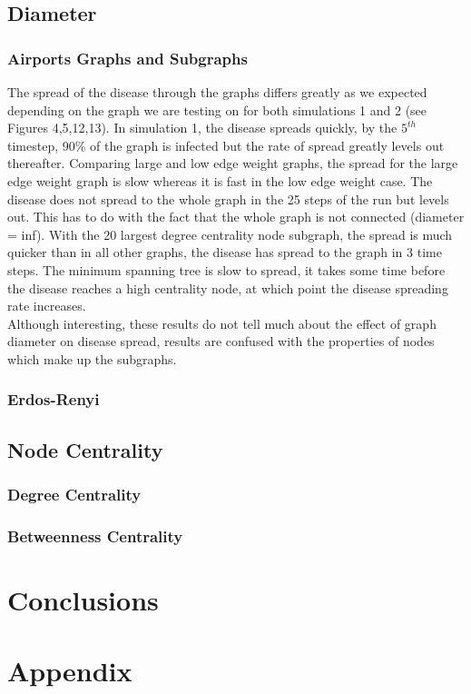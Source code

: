 \documentclass[a4paper,11pt]{article}
\begin{document}
\subsection*{Diameter}
\subsubsection*{Airports Graphs and Subgraphs}
The spread of the disease through the graphs differs greatly as we expected depending on the graph we are testing on for both simulations 1 and 2 (see Figures 4,5,12,13). 
In simulation 1, the disease spreads quickly, by the $5^{th}$ timestep, 90\% of the graph is infected but the rate of spread greatly levels out thereafter. Comparing large and low edge weight graphs, the spread for the large edge weight graph is slow whereas it is fast in the low edge weight case. The disease does not spread to the whole graph in the 25 steps of the run but levels out. This has to do with the fact that the whole graph is not connected (diameter = inf). With the 20 largest degree centrality node subgraph, the spread is much quicker than in all other graphs, the disease has spread to the graph in 3 time steps. The minimum spanning tree is slow to spread, it takes some time before the disease reaches a high centrality node, at which point the disease spreading rate increases.\\
Although interesting, these results do not tell much about the effect of graph diameter on disease spread, results are confused with the properties of nodes which make up the subgraphs.

\subsubsection*{Erdos-Renyi}

\subsection*{Node Centrality}

\subsubsection*{Degree Centrality}

\subsubsection*{Betweenness Centrality}


\section{Conclusions}

\section{Appendix}


\end{document}
